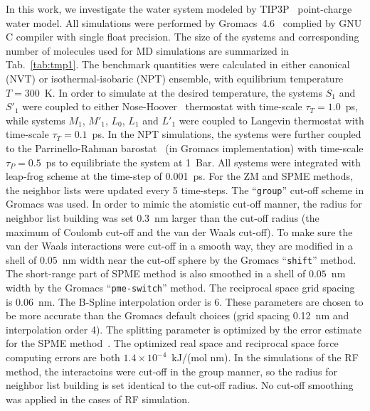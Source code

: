 \documentclass[aip,jcp,a4paper,preprint,unsortedaddress,onecolumn,fleqn]{revtex4-1}
\newcommand{\systemsb}{S_1}
\newcommand{\systemsbp}{S'_1}
\newcommand{\systemmb}{M_1}
\newcommand{\systemmbp}{M'_1}
\newcommand{\systemla}{L_0}
\newcommand{\systemlbp}{L'_1}
\newcommand{\systemlb}{L_1}
\begin{document}
In this work, we investigate the water system modeled by
TIP3P~\cite{jorgensen1983comparison} point-charge water model.
All simulations were performed by Gromacs~4.6~\cite{hess2008gromacs, pronk2013gromacs} complied by GNU C compiler with single float precision.
The size of the systems and corresponding number of molecules used for MD simulations are summarized in Tab.~\ref{tab:tmp1}.
The benchmark quantities were calculated in either  canonical (NVT) or isothermal-isobaric (NPT) ensemble, with equilibrium temperature $T=300$~K.
In order to simulate at the desired temperature,
the systems $\systemsb$ and $\systemsbp$ were coupled to either Nose-Hoover~\cite{nose1984molecular,hoover1985canonical} thermostat with time-scale $\tau_T = 1.0$~ps,
while systems $\systemmb$, $\systemmbp$, $\systemla$, $\systemlb$ and $\systemlbp$ were coupled to Langevin thermostat with time-scale $\tau_T = 0.1$~ps.
In the NPT simulations, the systems were further coupled
to the Parrinello-Rahman barostat~\cite{parrinello1980crystal,parrinello1981polymorphic} (in Gromacs implementation)
with time-scale $\tau_P = 0.5$~ps to equilibriate the system at 1~Bar.
All systems were integrated with leap-frog scheme at the time-step of 0.001~ps.
For the ZM and SPME methods,
the neighbor lists were updated every 5 time-steps.
The ``\texttt{group}'' cut-off scheme in Gromacs was used. In order to mimic the atomistic
cut-off manner, the radius for neighbor list building was set 0.3~nm
larger than the cut-off radius (the maximum of Coulomb cut-off and the van der Waals cut-off).
To make sure the van der Waals interactions were cut-off in a smooth way,
they are modified in a shell of $0.05$~nm width near the cut-off sphere by the Gromacs ``\texttt{shift}'' method.
The short-range part of SPME method is also smoothed in a shell of $0.05$~nm width  by the Gromacs ``\texttt{pme-switch}'' method.
The reciprocal space
grid spacing is 0.06~nm. The B-Spline interpolation order is 6.
These parameters are chosen to be more accurate than the Gromacs default choices (grid spacing 0.12~nm and interpolation order 4).
The splitting parameter is optimized by the error estimate for the SPME method~\cite{wang2010optimizing}.
The optimized real space and reciprocal space force computing errors are both $1.4\times10^{-4}$~kJ/(mol nm).
In the simulations of the RF method, the interactoins were cut-off in the group manner,
so the radius for neighbor list building is set identical to the cut-off radius.
No cut-off smoothing was applied in the cases of RF simulation.
\end{document}
